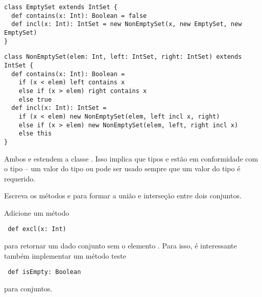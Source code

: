 \begin{lstlisting}
class EmptySet extends IntSet {
  def contains(x: Int): Boolean = false
  def incl(x: Int): IntSet = new NonEmptySet(x, new EmptySet, new EmptySet)
}
\end{lstlisting}

\begin{lstlisting}
class NonEmptySet(elem: Int, left: IntSet, right: IntSet) extends IntSet {
  def contains(x: Int): Boolean =
    if (x < elem) left contains x
    else if (x > elem) right contains x
    else true
  def incl(x: Int): IntSet =
    if (x < elem) new NonEmptySet(elem, left incl x, right)
    else if (x > elem) new NonEmptySet(elem, left, right incl x)
    else this
}
\end{lstlisting}
Ambos  e  estendem a classe . Isso implica
que tipos  e  est\~{a}o em conformidade com o tipo  -- 
um valor do tipo  ou  pode ser usado sempre que um valor 
 do tipo  \'{e} requerido.

\begin{exercise}
Escreva os m\'{e}todos  e  para formar a uni\~{a}o e interse\c{c}\~{a}o entre
dois conjuntos.
\end{exercise}
 \begin{exercise} Adicione um m\'{e}todo  
 \begin{lstlisting}
 def excl(x: Int)
 \end{lstlisting}
para retornar um dado conjunto sem o elemento . Para isso, \'{e} interessante tamb\'{e}m 
implementar um m\'{e}todo teste
 \begin{lstlisting}
 def isEmpty: Boolean
 \end{lstlisting}
para conjuntos.
 \end{exercise}


